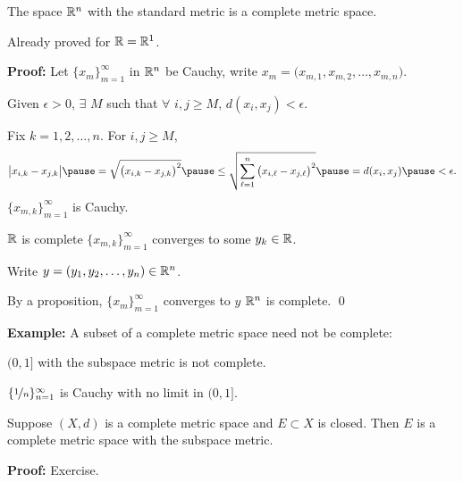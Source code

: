 \documentclass[10pt,aspectratio=149]{beamer}
\begin{document}
\begin{frame}

\begin{proposition}
The space ${\mathbb{R}}^n$ with the standard metric is a complete metric space.
\end{proposition}

\pause
Already proved for ${\mathbb{R}} = {\mathbb{R}}^1$.

\pause
\medskip

\textbf{Proof:}
Let $\{ x_m \}_{m=1}^\infty$ in ${\mathbb{R}}^n$ be Cauchy,
\pause
\quad write 
$x_m = \bigl(x_{m,1},x_{m,2},\ldots,x_{m,n}\bigr)$.

\pause
\medskip

Given $\epsilon > 0$, $\exists$ $M$ such that $\forall$
$i,j \geq M$,
\quad 
$d(x_i,x_j) < \epsilon$.

\pause
\medskip

Fix $k=1,2,\ldots,n$.
\pause
For $i,j \geq M$,
\[
\bigl\lvert x_{i,k} - x_{j,k} \bigr\rvert
\pause
=
\sqrt{{\bigl(x_{i,k} - x_{j,k}\bigr)}^2}
\pause
\leq
\sqrt{\sum_{\ell=1}^n {\bigl(x_{i,\ell}-x_{j,\ell}\bigr)}^2}
\pause
= d(x_i,x_j)
\pause
< \epsilon .
\]
\pause
\thus \quad
$\{ x_{m,k} \}_{m=1}^\infty$ is Cauchy.

\pause
\medskip

${\mathbb{R}}$ is complete
\pause
\wthus
$\{ x_{m,k} \}_{m=1}^\infty$ converges to some $y_k \in {\mathbb{R}}$.

\pause
\medskip

Write $y = (y_1,y_2,\ldots,y_n) \in {\mathbb{R}}^n$.

\pause
By a proposition, $\{ x_m \}_{m=1}^\infty$ converges
to $y$
\pause
\wthus ${\mathbb{R}}^n$ is complete.
\qed

\end{frame}

\begin{frame}

%

\textbf{Example:}
A subset of a complete metric space need not be complete:

\pause
$(0,1]$ with the subspace metric is not complete.

\pause
$\{ \nicefrac{1}{n} \}_{n=1}^\infty$ is Cauchy
with no limit in $(0,1]$.

\pause
\begin{proposition}
Suppose $(X,d)$ is a complete metric space and $E \subset X$
is closed.
\pause
Then $E$ is a complete metric space with the subspace metric.
\end{proposition}

\pause
\textbf{Proof:} Exercise.

\end{frame}
\end{document}
